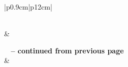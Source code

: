 \documentclass[11pt]{report}
\begin{document}
\begin{longtable}{|p{0.9cm}|p{12cm}|}
\caption[The functional requirements of Roslyn]{The functional requirements of Roslyn} 
\label{table:functional-requirements} \\

\hline {} &  \\ \hline 
\endfirsthead

%
{{\bfseries \tablename\ \thetable{} -- continued from previous page}} \\
\hline {} &  \\ \hline 
\endhead

 \\ \hline
\endfoot

\endlastfoot


\end{longtable}
\end{document}
